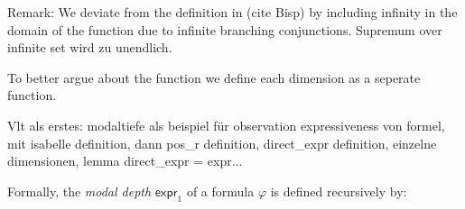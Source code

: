 \begin{isabellebody}
\begin{isamarkuptext}
Remark: We deviate from the definition in (cite Bisp) by including infinity in the domain of the function due to infinite branching conjunctions. Supremum over infinite set wird zu unendlich.%
\end{isamarkuptext}\isamarkuptrue%
%
\begin{isamarkuptext}%
To better argue about the function we define each dimension as a seperate function.%
\end{isamarkuptext}\isamarkuptrue%
%
\begin{isamarkuptext}%
Vlt als erstes: modaltiefe als beispiel für observation expressiveness von formel, mit isabelle definition,
dann pos\_r definition,
direct\_expr definition,
einzelne dimensionen,
lemma direct\_expr = expr...%
\end{isamarkuptext}\isamarkuptrue%
%
\begin{isamarkuptext}%
Formally, the \textit{modal depth} $\textsf{expr}_1$ of a formula $\varphi$ is defined recursively by:


\end{isamarkuptext}
\end{isabellebody}
